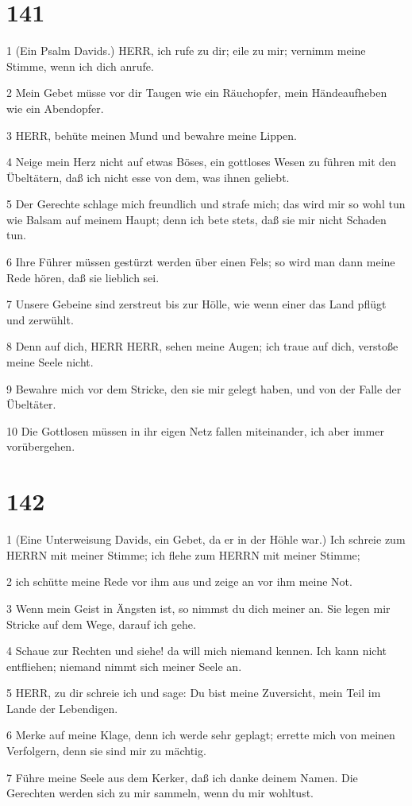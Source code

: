\chapter{141}

\par 1 (Ein Psalm Davids.) HERR, ich rufe zu dir; eile zu mir; vernimm meine Stimme, wenn ich dich anrufe.
\par 2 Mein Gebet müsse vor dir Taugen wie ein Räuchopfer, mein Händeaufheben wie ein Abendopfer.
\par 3 HERR, behüte meinen Mund und bewahre meine Lippen.
\par 4 Neige mein Herz nicht auf etwas Böses, ein gottloses Wesen zu führen mit den Übeltätern, daß ich nicht esse von dem, was ihnen geliebt.
\par 5 Der Gerechte schlage mich freundlich und strafe mich; das wird mir so wohl tun wie Balsam auf meinem Haupt; denn ich bete stets, daß sie mir nicht Schaden tun.
\par 6 Ihre Führer müssen gestürzt werden über einen Fels; so wird man dann meine Rede hören, daß sie lieblich sei.
\par 7 Unsere Gebeine sind zerstreut bis zur Hölle, wie wenn einer das Land pflügt und zerwühlt.
\par 8 Denn auf dich, HERR HERR, sehen meine Augen; ich traue auf dich, verstoße meine Seele nicht.
\par 9 Bewahre mich vor dem Stricke, den sie mir gelegt haben, und von der Falle der Übeltäter.
\par 10 Die Gottlosen müssen in ihr eigen Netz fallen miteinander, ich aber immer vorübergehen.

\chapter{142}

\par 1 (Eine Unterweisung Davids, ein Gebet, da er in der Höhle war.) Ich schreie zum HERRN mit meiner Stimme; ich flehe zum HERRN mit meiner Stimme;
\par 2 ich schütte meine Rede vor ihm aus und zeige an vor ihm meine Not.
\par 3 Wenn mein Geist in Ängsten ist, so nimmst du dich meiner an. Sie legen mir Stricke auf dem Wege, darauf ich gehe.
\par 4 Schaue zur Rechten und siehe! da will mich niemand kennen. Ich kann nicht entfliehen; niemand nimmt sich meiner Seele an.
\par 5 HERR, zu dir schreie ich und sage: Du bist meine Zuversicht, mein Teil im Lande der Lebendigen.
\par 6 Merke auf meine Klage, denn ich werde sehr geplagt; errette mich von meinen Verfolgern, denn sie sind mir zu mächtig.
\par 7 Führe meine Seele aus dem Kerker, daß ich danke deinem Namen. Die Gerechten werden sich zu mir sammeln, wenn du mir wohltust.

